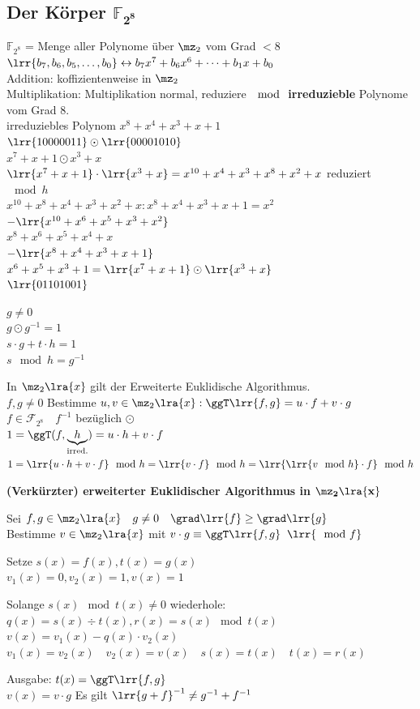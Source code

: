 	\subsection{Der Körper \texorpdfstring{$\mathbf{\mathbb{F}_{2^8}}$}{F}}
		$\mathbb{F}_{2^8}$ = Menge aller Polynome über $\mz_2$ vom Grad $<8$\\
		$\lrr{b_7,b_6,b_5,\dots,b_0}\leftrightarrow b_7x^7+b_6x^6+\dots+b_1x+b_0$\\
		Addition: koffizientenweise in $\mz_2$\\
		Multiplikation: Multiplikation normal, reduziere $\mod$ \textbf{irreduzieble} Polynome vom Grad $8$.\\
		irreduziebles Polynom $x^8+x^4+x^3+x+1$\\
		$\lrr{10000011}\odot\lrr{00001010}$\\
		$x^7+x+1\odot x^3+x$\\
		$\lrr{x^7+x+1}\cdot\lrr{x^3+x}=x^{10}+x^4+x^3+x^8+x^2+x$ reduziert $\mod h$ \\
		$x^{10}+x^8+x^4+x^3+x^2+x : x^8+x^4+x^3+x+1=x^2$\\
		$-\lrr{x^{10}+x^6+x^5+x^3+x^2}$\\
		$x^8+x^6+x^5+x^4+x$\\
		$-\lrr{x^8+x^4+x^3+x+1}$\\
		$x^6+x^5+x^3+1 =\lrr{x^7+x+1}\odot\lrr{x^3+x}$\\
		$\lrr{01101001}$
		
		$g\neq 0$\\
		$g\odot g^{-1} =1$\\
		$s\cdot g + t\cdot h=1$\\
		$s\mod h = g^{-1}$
		
		In $\mz_2\lra{x}$ gilt der Erweiterte Euklidische Algorithmus.\\
		$f,g\neq 0$ Bestimme $u,v\in\mz_2\lra{x}:\ggT\lrr{f,g}=u\cdot f+v\cdot g$\\
		$f\in\mathcal{F}_{2^8}\quad f^{-1}$ bezüglich $\odot$\\
		$1=\ggT(f,\underbrace{h}_{\mbox{\scriptsize irred.}}) = u\cdot h+v\cdot f$\\
		$1=\lrr{u\cdot h+v\cdot f}\mod h=\lrr{v\cdot f}\mod h=\lrr{\lrr{v\mod h}\cdot f}\mod h$
		
		\textbf{(Verkürzter) erweiterter Euklidischer Algorithmus in }$\mathbf{\mz_2\lra{x}}$
		
		Sei $f,g\in \mz_2\lra{x}\quad g\neq 0\quad \grad\lrr{f}\geq\grad\lrr{g}$\\
		Bestimme $v\in\mz_2\lra{x}$ mit $v\cdot g\equiv\ggT\lrr{f,g}\;\;\lrr{\mod f}$
			\item Setze $s(x)=f(x),t(x)=g(x)$\\
				$v_1(x)=0,v_2(x)=1,v(x)=1$
			\item Solange $s(x)\mod t(x)\neq 0$ wiederhole:\\
				$q(x) =s(x)\div t(x), r(x)=s(x)\mod t(x)$\\
				$v(x)=v_1(x)-q(x)\cdot v_2(x)$\\
				$v_1(x)=v_2(x)\quad v_2(x)=v(x)\quad s(x)=t(x)\quad t(x)=r(x)$
			\item Ausgabe: $t(x) =\ggT\lrr{f,g}$\\
				$v(x)=v\cdot g$
		\subExEnd
		Es gilt $\lrr{g+f}^{-1}\neq g^{-1}+f^{-1}$
